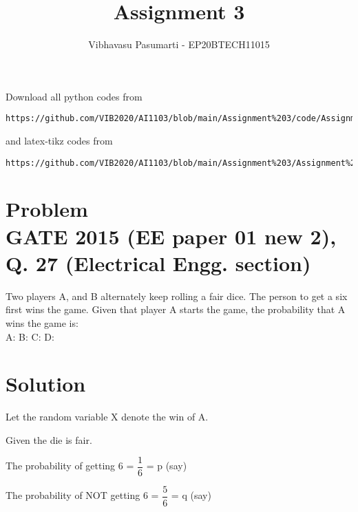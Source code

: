 \documentclass[journal,12pt,twocolumn]{IEEEtran}
\begin{document}
\title{Assignment 3}
\author{Vibhavasu Pasumarti - EP20BTECH11015}
\maketitle
\newpage
\bigskip
\renewcommand{\thefigure}{\theenumi}
\renewcommand{\thetable}{\theenumi}
Download all python codes from 
\begin{lstlisting}
https://github.com/VIB2020/AI1103/blob/main/Assignment%203/code/Assignment%203.py
\end{lstlisting}
%
and latex-tikz codes from 
%
\begin{lstlisting}
https://github.com/VIB2020/AI1103/blob/main/Assignment%203/Assignment%203.pdf
\end{lstlisting}
\section{\Large Problem\\ \large GATE 2015 (EE paper 01 new 2), Q. 27 (Electrical Engg. section)}

Two players A, and B alternately keep rolling a fair dice. The person to get a six first wins the game. Given that player A starts the game, the probability that A wins the game is:\\[5pt]
A: \hspace{1cm}
B: \hspace{1cm}
C: \hspace{1cm}
D: 
\section{\Large Solution}
\begin{description}
    \item Let the random variable X denote the win of A.
    \item Given the die is fair.
    \item The probability of getting 6 = $\dfrac{1}{6}$ = p (say)
    \item The probability of NOT getting 6 = $\dfrac{5}{6}$ = q (say)
    \item \Large
\end{description}
\end{document}

